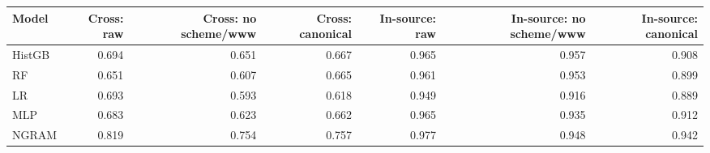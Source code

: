 {\scriptsize\setlength{\tabcolsep}{3.5pt}
\begin{tabular}{lrrrrrr}
\toprule
\textbf{Model} & \textbf{Cross: raw} & \textbf{Cross: no scheme/www} & \textbf{Cross: canonical} & \textbf{In-source: raw} & \textbf{In-source: no scheme/www} & \textbf{In-source: canonical} \\
\midrule
HistGB & 0.694 & 0.651 & 0.667 & 0.965 & 0.957 & 0.908 \\
RF & 0.651 & 0.607 & 0.665 & 0.961 & 0.953 & 0.899 \\
LR & 0.693 & 0.593 & 0.618 & 0.949 & 0.916 & 0.889 \\
MLP & 0.683 & 0.623 & 0.662 & 0.965 & 0.935 & 0.912 \\
NGRAM & 0.819 & 0.754 & 0.757 & 0.977 & 0.948 & 0.942 \\
\bottomrule
\end{tabular}
}
